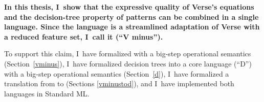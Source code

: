 \documentclass[manuscript,screen,review, 12pt, nonacm]{acmart}
\begin{document}
\bf{In this thesis, I~show} that the expressive quality of Verse's equations and
the decision-tree property of patterns can be combined in a single language.
Since the language is a streamlined adaptation of Verse with a reduced feature
set, I~call it \VMinus (“V minus”). 

To support this claim, I~have formalized \VMinus with a big-step operational
semantics (Section~\ref{vminus}), I~have formalized decision trees into a core
language \D (“D”) with a big-step operational semantics (Section~\ref{d}), 
I~have formalized a translation from \VMinus to \D (Sections \ref{vminustod}),
and I~have implemented both languages in Standard ML. 
\end{document}
